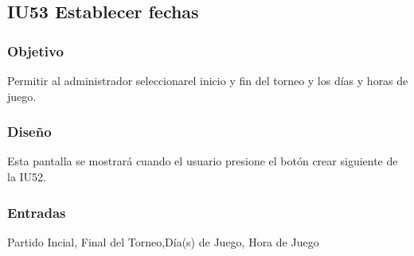 
\subsection{IU53 Establecer fechas}

\subsubsection{Objetivo}
	Permitir al administrador seleccionarel inicio y fin del torneo y los días y horas de juego.

\subsubsection{Diseño}
	Esta pantalla se mostrará cuando el usuario presione el botón crear siguiente de la IU52.



\subsubsection{Entradas}
	Partido Incial, Final del Torneo,Día(s) de Juego, Hora de Juego
